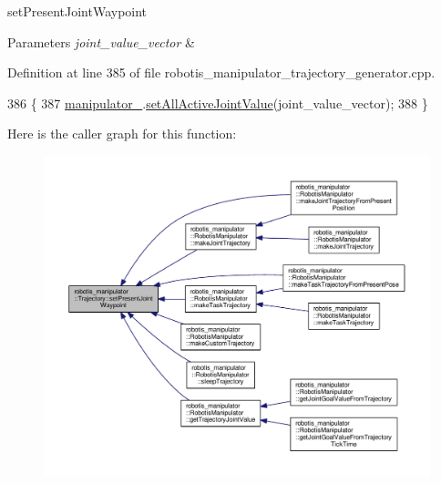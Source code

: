 set\+Present\+Joint\+Waypoint 


\begin{DoxyParams}{Parameters}
{\em joint\+\_\+value\+\_\+vector} & \\
\hline
\end{DoxyParams}


Definition at line 385 of file robotis\+\_\+manipulator\+\_\+trajectory\+\_\+generator.\+cpp.


\begin{DoxyCode}
386 \{
387   \hyperlink{classrobotis__manipulator_1_1_trajectory_acd9fd9ae6cc065a10d9d438cda1081de}{manipulator\_}.\hyperlink{classrobotis__manipulator_1_1_manipulator_af42c8e7d8b0a1fe505832d632348e804}{setAllActiveJointValue}(joint\_value\_vector);
388 \}
\end{DoxyCode}


Here is the caller graph for this function\+:\nopagebreak
\begin{figure}[H]
\begin{center}
\leavevmode
\includegraphics[width=350pt]{classrobotis__manipulator_1_1_trajectory_a58b1d4fb60f7e3ed9150d312766debc1_icgraph}
\end{center}
\end{figure}


